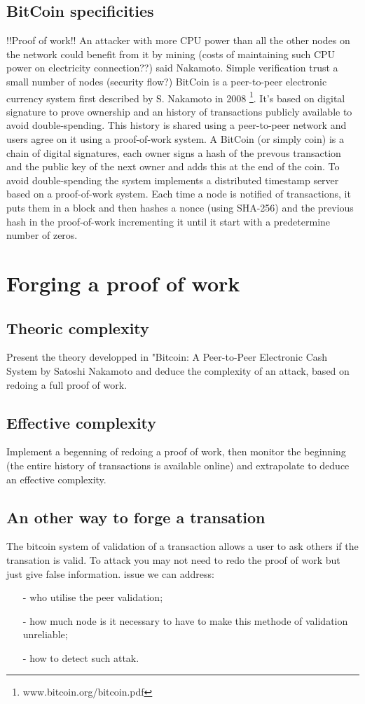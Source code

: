\documentclass{acm_proc_article-sp}
\begin{document}
\subsection{BitCoin specificities}
!!Proof of work!!
An attacker with more CPU power than all the other nodes on the network
could benefit from it by mining (costs of maintaining such CPU
power on electricity connection??) said Nakamoto. Simple verification 
trust a small number of nodes (security flow?)
BitCoin is a peer-to-peer electronic currency system first described
by S. Nakamoto in 2008 \footnote{www.bitcoin.org/bitcoin.pdf}. It's based on
digital signature to prove ownership and an history of transactions publicly 
available to avoid double-spending. This history is shared using a peer-to-peer 
network and users agree on it using a proof-of-work system.
A BitCoin (or simply coin) is a chain of digital signatures, each owner signs
a hash of the prevous transaction and the public key of the next owner and 
adds this at the end of the coin. To avoid double-spending the system implements
a distributed timestamp server based on a proof-of-work system. Each time a 
node is notified of transactions, it puts them in a block and then hashes a
nonce (using SHA-256) and the previous hash in the proof-of-work incrementing 
it until it start with a predetermine number of zeros.     


\section{Forging a proof of work}
\subsection{Theoric complexity}
Present the theory developped in "Bitcoin: A Peer-to-Peer Electronic Cash System
by Satoshi Nakamoto and deduce the complexity of an attack, based on 
redoing a full proof of work.

\subsection{Effective complexity}
Implement a begenning of redoing a proof of work, then monitor the 
beginning (the entire history of transactions is available online)
and extrapolate to deduce an effective complexity.
\subsection{An other way to forge a transation}
The bitcoin system of validation of a transaction allows a user to ask others if the transation is valid. To attack you may not need to redo the proof of work but just give false information. issue we can address:
\begin{itemize}

\item[-] who utilise the peer validation;
\item [-]how much node is it necessary to have to make this methode of validation unreliable;
\item[-] how to detect such attak.

\end{itemize}
\end{document}
